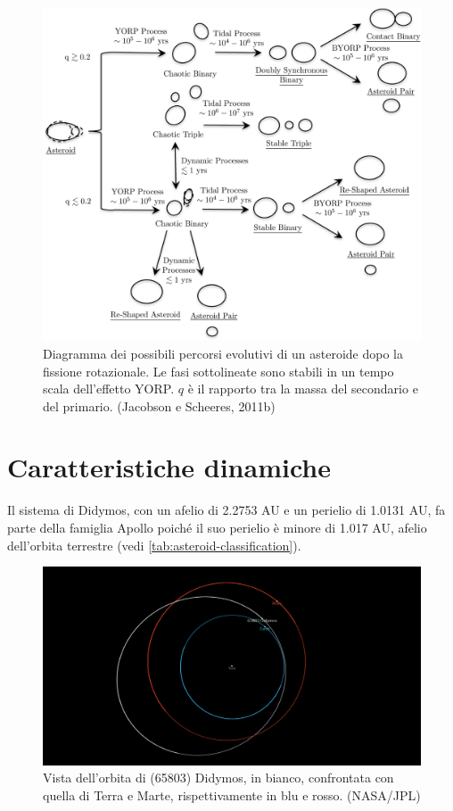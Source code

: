 \documentclass[a4paper,11pt,openright]{book}
\begin{document}
\begin{figure}
    \centering
    \includegraphics[scale=0.73]{figure/binaries_evolution.jpg}
    \caption[Diagramma dei possibili percorsi evolutivi di un piccolo asteroide.]{Diagramma dei possibili percorsi evolutivi di un asteroide dopo la fissione rotazionale. Le fasi sottolineate sono stabili in un tempo scala dell'effetto YORP. $q$ è il rapporto tra la massa del secondario e del primario. (Jacobson e Scheeres, 2011b)}
    \label{fig:binaries_evolution}
\end{figure}

\section{Caratteristiche dinamiche}
Il sistema di Didymos, con un afelio di 2.2753 AU e un perielio di 1.0131 AU, fa parte della famiglia Apollo poiché il suo perielio è minore di 1.017 AU, afelio dell'orbita terrestre (vedi \cref{tab:asteroid-classification}).

\begin{figure}[!h]
    \centering
    \includegraphics[scale=0.18]{figure/orbit_viewer.jpg}
    \caption[Vista dell'orbita di (65803) Didymos.]{Vista dell'orbita di (65803) Didymos, in bianco, confrontata con quella di Terra e Marte, rispettivamente in blu e rosso. (NASA/JPL)}
    \label{fig:orbit_view}
\end{figure}
\end{document}
